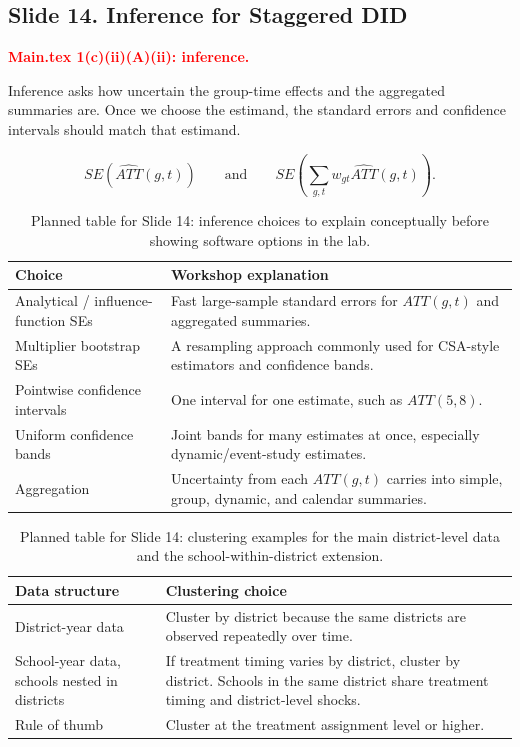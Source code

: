 \documentclass[11pt]{article}
\newcommand{\slideheading}[2]{%
  \subsection*{Slide #1. #2}
}
\newcommand{\slidecontent}[1]{#1}
\newcommand{\mainpoint}[1]{%
  \slidecontent{\textcolor{red}{\textbf{Main.tex #1}}}
}
\begin{document}
\clearpage

\slideheading{14}{Inference for Staggered DID}
\mainpoint{1(c)(ii)(A)(ii): inference.}

\slidecontent{Inference asks how uncertain the group-time effects and the
aggregated summaries are. Once we choose the estimand, the standard errors and
confidence intervals should match that estimand.}

\[
SE\!\left(\widehat{ATT}(g,t)\right)
\qquad \text{and} \qquad
SE\!\left(\sum_{g,t} w_{gt}\widehat{ATT}(g,t)\right).
\]

\begin{table}[H]
\centering
\small
\begin{tabular}{@{}L{0.27\textwidth}L{0.57\textwidth}@{}}
\toprule
\textbf{Choice} & \textbf{Workshop explanation} \\
\midrule
Analytical / influence-function SEs & Fast large-sample standard errors for $ATT(g,t)$ and aggregated summaries. \\
Multiplier bootstrap SEs & A resampling approach commonly used for CSA-style estimators and confidence bands. \\
Pointwise confidence intervals & One interval for one estimate, such as $ATT(5,8)$. \\
Uniform confidence bands & Joint bands for many estimates at once, especially dynamic/event-study estimates. \\
Aggregation & Uncertainty from each $ATT(g,t)$ carries into simple, group, dynamic, and calendar summaries. \\
\bottomrule
\end{tabular}
\caption*{\footnotesize Planned table for Slide 14: inference choices to explain conceptually before showing software options in the lab.}
\end{table}

\begin{table}[H]
\centering
\small
\begin{tabular}{@{}L{0.31\textwidth}L{0.53\textwidth}@{}}
\toprule
\textbf{Data structure} & \textbf{Clustering choice} \\
\midrule
District-year data & Cluster by district because the same districts are observed repeatedly over time. \\
School-year data, schools nested in districts & If treatment timing varies by district, cluster by district. Schools in the same district share treatment timing and district-level shocks. \\
Rule of thumb & Cluster at the treatment assignment level or higher. \\
\bottomrule
\end{tabular}
\caption*{\footnotesize Planned table for Slide 14: clustering examples for the main district-level data and the school-within-district extension.}
\end{table}
\end{document}
